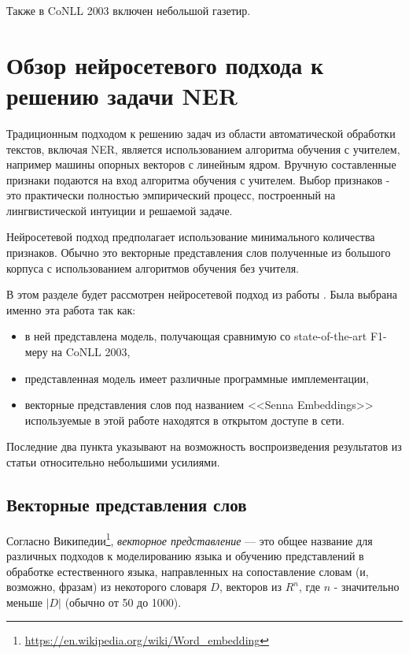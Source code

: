   Также в CoNLL 2003 включен небольшой газетир.

  \section{Обзор нейросетевого подхода к решению задачи NER}  \label{section:nn}

  Традиционным подходом к решению задач из области автоматической обработки текстов,
  включая NER, является использованием алгоритма обучения с учителем, например
  машины опорных векторов с линейным ядром. Вручную составленные признаки подаются на вход
  алгоритма обучения с учителем. Выбор признаков - это практически полностью эмпирический
  процесс, построенный на лингвистической интуиции и решаемой задаче.

  Нейросетевой подход предполагает использование минимального количества признаков.
  Обычно это векторные представления слов полученные из большого корпуса с использованием
  алгоритмов обучения без учителя.

  В этом разделе будет рассмотрен нейросетевой подход из работы
  \citep{collobert2011natural}. Была выбрана именно эта работа так как:
  \begin{itemize}
  \item в ней представлена модель, получающая сравнимую со state-of-the-art F1-меру на CoNLL 2003,
  \item представленная модель имеет различные программные имплементации,
  \item векторные представления слов под названием <<Senna Embeddings>>
    используемые в этой работе находятся в открытом доступе в сети.
  \end{itemize}
  Последние два пункта указывают на возможность воспроизведения результатов из статьи относительно небольшими усилиями.

  \subsection{Векторные представления слов}

  Согласно Википедии\footnote{\url{https://en.wikipedia.org/wiki/Word_embedding}},
  \textit{векторное представление} — это общее название для различных
  подходов к моделированию языка и обучению представлений в обработке естественного языка,
  направленных на сопоставление словам (и, возможно, фразам) из некоторого словаря $D$,
  векторов из $R^n$, где $n$ - значительно меньше $|D|$ (обычно от 50 до 1000).

